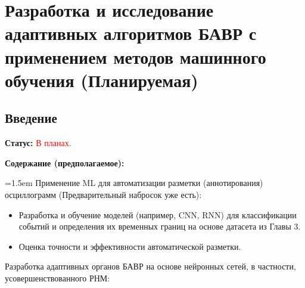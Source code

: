 
\chapter{Разработка и исследование адаптивных алгоритмов БАВР с применением методов машинного обучения (Планируемая)}
\label{ch:ml_adaptive_algorithms}

\section{Введение}
\label{sec:ch05_intro}

\textbf{Статус:} \textcolor{red}{В планах.}

\textbf{Содержание (предполагаемое):}

{\emergencystretch=1.5em Применение ML для автоматизации разметки (аннотирования) осциллограмм (Предварительный набросок уже есть):\par}

\begin{itemize}
    \item Разработка и обучение моделей (например, CNN, RNN) для классификации событий и определения их временных границ на основе датасета из Главы 3.
    \item Оценка точности и эффективности автоматической разметки.
\end{itemize}


Разработка адаптивных органов БАВР на основе нейронных сетей, в частности, усовершенствованного РНМ:

